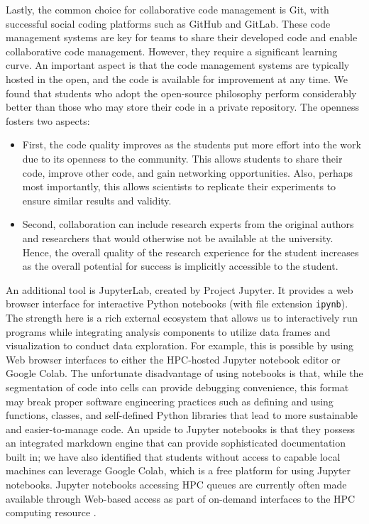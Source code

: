 \documentclass[utf8]{FrontiersinVancouver} %
\begin{document}
Lastly, the common choice for collaborative code management is Git, with successful social coding platforms such as GitHub and GitLab. These code management systems are key for teams to share their developed code and enable collaborative code management.  However, they require a significant learning curve. An important aspect is that the code management systems are typically hosted in the open, and the code is available for improvement at any time. We found that students who adopt the open-source philosophy perform considerably better than those who may store their code in a private repository. The openness fosters two aspects: 

\begin{itemize}
    \item First, the code quality improves as the students put more effort into the work due to its openness to the community. This allows students to share their code, improve other code, and gain networking opportunities. Also, perhaps most importantly, this allows scientists to replicate their experiments to ensure similar results and validity. 
    \item Second, collaboration can include research experts from the original authors and researchers that would otherwise not be available at the university. Hence, the overall quality of the research experience for the student increases as the overall potential for success is implicitly accessible to the student.
\end{itemize}

An additional tool is JupyterLab, created by Project Jupyter. It provides a web browser interface for interactive Python notebooks (with file extension \verb|ipynb|). The strength here is a rich external ecosystem that allows us to interactively run programs while integrating analysis components to utilize data frames and visualization to conduct data exploration. For example, this is possible by using Web browser interfaces to either the HPC-hosted Jupyter notebook editor or Google Colab. The unfortunate disadvantage of using notebooks is that, while the segmentation of code into cells can provide debugging convenience, this format may break proper software engineering practices such as defining and using functions, classes, and self-defined Python libraries that lead to more sustainable and easier-to-manage code. An upside to Jupyter notebooks is that they possess an integrated markdown engine that can provide sophisticated documentation built in; we have also identified that students without access to capable local machines can leverage Google Colab, which is a free platform for using Jupyter notebooks. Jupyter notebooks accessing HPC queues are currently often made available through Web-based access as part of on-demand interfaces to the HPC computing resource \cite{uva-ondemand}.
\end{document}
